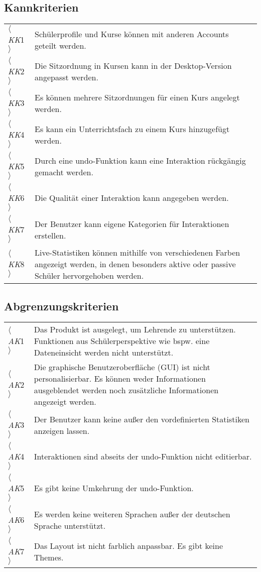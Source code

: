 \subsection{Kannkriterien}
\label{list:Kannkriterien}

\begin{tabular}{p{1.1cm}p{12.9cm}}
     $\langle$\textit{KK}1$\rangle$ &  Schülerprofile und Kurse können mit anderen \Gls{Account}s geteilt werden.\\
     $\langle$\textit{KK}2$\rangle$ & Die Sitzordnung in Kursen kann in der \Gls{Desktop}-Version angepasst werden.\\
     $\langle$\textit{KK}3$\rangle$ & Es können mehrere Sitzordnungen für einen Kurs angelegt werden.\\
     $\langle$\textit{KK}4$\rangle$ & Es kann ein Unterrichtsfach zu einem Kurs hinzugefügt werden.\\
     $\langle$\textit{KK}5$\rangle$ & Durch eine \Gls{undo}-Funktion kann eine Interaktion rückgängig gemacht werden.\\
     $\langle$\textit{KK}6$\rangle$ & Die Qualität einer Interaktion kann angegeben werden.\\
     $\langle$\textit{KK}7$\rangle$ & Der Benutzer kann eigene Kategorien für Interaktionen erstellen.\\
     $\langle$\textit{KK}8$\rangle$ & \Gls{Live}-Statistiken können mithilfe von verschiedenen Farben angezeigt werden, in denen besonders aktive oder passive Schüler hervorgehoben werden.\\
\end{tabular}

\subsection{Abgrenzungskriterien}
\label{list:Abgrenzungskriterien}

\begin{tabular}{p{1.1cm}p{12.9cm}}
     $\langle$\textit{AK}1$\rangle$ & Das Produkt ist ausgelegt, um Lehrende zu unterstützen. Funktionen aus Schülerperspektive wie bspw. eine Dateneinsicht werden nicht unterstützt.\\
        $\langle$\textit{AK}2$\rangle$ & Die graphische Benutzeroberfläche (\Gls{GUI}) ist nicht personalisierbar. Es können weder Informationen ausgeblendet werden noch zusätzliche Informationen angezeigt werden.\\
        $\langle$\textit{AK}3$\rangle$ & Der Benutzer kann keine außer den vordefinierten Statistiken anzeigen lassen.\\
     $\langle$\textit{AK}4$\rangle$ & Interaktionen sind abseits der \Gls{undo}-Funktion nicht editierbar.\\
     $\langle$\textit{AK}5$\rangle$ & Es gibt keine Umkehrung der \Gls{undo}-Funktion.\\
     $\langle$\textit{AK}6$\rangle$ & Es werden keine weiteren Sprachen außer der deutschen Sprache unterstützt. \\
     $\langle$\textit{AK}7$\rangle$ & Das Layout ist nicht farblich anpassbar. Es gibt keine \Gls{Themes}.\\
\end{tabular}

